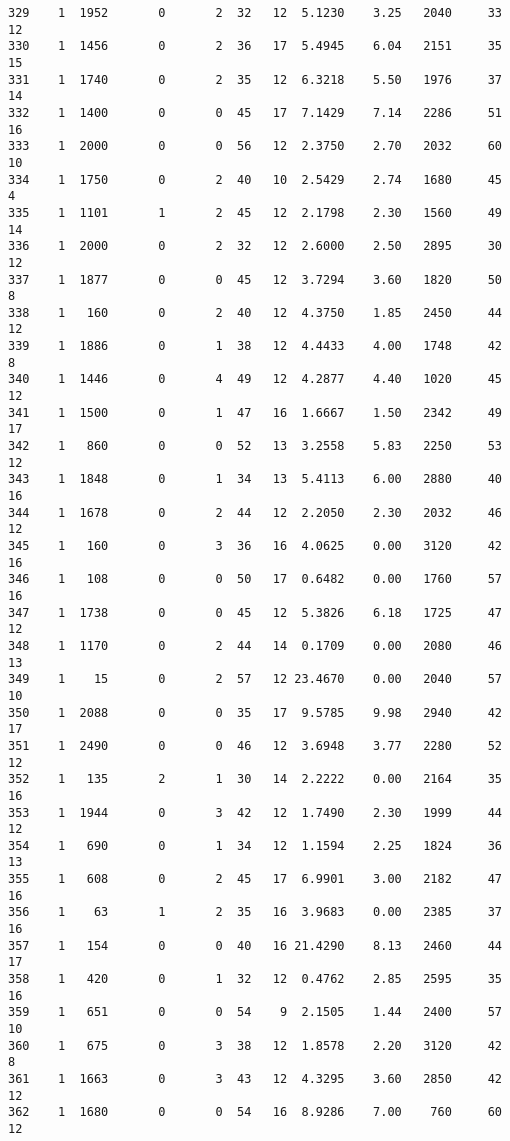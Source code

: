 \documentclass[
  letterpaper,
  DIV=11,
  numbers=noendperiod]{scrreprt}
\begin{document}
\begin{verbatim}
329    1  1952       0       2  32   12  5.1230    3.25   2040     33      12
330    1  1456       0       2  36   17  5.4945    6.04   2151     35      15
331    1  1740       0       2  35   12  6.3218    5.50   1976     37      14
332    1  1400       0       0  45   17  7.1429    7.14   2286     51      16
333    1  2000       0       0  56   12  2.3750    2.70   2032     60      10
334    1  1750       0       2  40   10  2.5429    2.74   1680     45       4
335    1  1101       1       2  45   12  2.1798    2.30   1560     49      14
336    1  2000       0       2  32   12  2.6000    2.50   2895     30      12
337    1  1877       0       0  45   12  3.7294    3.60   1820     50       8
338    1   160       0       2  40   12  4.3750    1.85   2450     44      12
339    1  1886       0       1  38   12  4.4433    4.00   1748     42       8
340    1  1446       0       4  49   12  4.2877    4.40   1020     45      12
341    1  1500       0       1  47   16  1.6667    1.50   2342     49      17
342    1   860       0       0  52   13  3.2558    5.83   2250     53      12
343    1  1848       0       1  34   13  5.4113    6.00   2880     40      16
344    1  1678       0       2  44   12  2.2050    2.30   2032     46      12
345    1   160       0       3  36   16  4.0625    0.00   3120     42      16
346    1   108       0       0  50   17  0.6482    0.00   1760     57      16
347    1  1738       0       0  45   12  5.3826    6.18   1725     47      12
348    1  1170       0       2  44   14  0.1709    0.00   2080     46      13
349    1    15       0       2  57   12 23.4670    0.00   2040     57      10
350    1  2088       0       0  35   17  9.5785    9.98   2940     42      17
351    1  2490       0       0  46   12  3.6948    3.77   2280     52      12
352    1   135       2       1  30   14  2.2222    0.00   2164     35      16
353    1  1944       0       3  42   12  1.7490    2.30   1999     44      12
354    1   690       0       1  34   12  1.1594    2.25   1824     36      13
355    1   608       0       2  45   17  6.9901    3.00   2182     47      16
356    1    63       1       2  35   16  3.9683    0.00   2385     37      16
357    1   154       0       0  40   16 21.4290    8.13   2460     44      17
358    1   420       0       1  32   12  0.4762    2.85   2595     35      16
359    1   651       0       0  54    9  2.1505    1.44   2400     57      10
360    1   675       0       3  38   12  1.8578    2.20   3120     42       8
361    1  1663       0       3  43   12  4.3295    3.60   2850     42      12
362    1  1680       0       0  54   16  8.9286    7.00    760     60      12

\end{verbatim}
\end{document}

